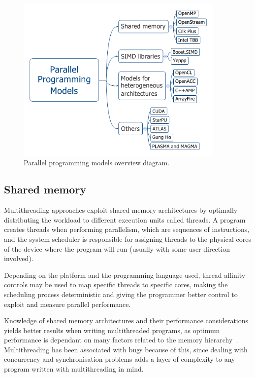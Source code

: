 \begin{figure}[!h]
\begin{center}
\centerline{\includegraphics[width=4in]{img/overview}}
\caption{Parallel programming models overview diagram.}
\label{f:overview}
\end{center}
\end{figure}

\subsection{Shared memory}

Multithreading approaches exploit \gls{shared memory} architectures by optimally distributing the workload to different execution units called \glspl{thread}. A program creates threads when performing parallelism, which are sequences of instructions, and the system scheduler is responsible for assigning threads to the physical cores of the device where the program will run (usually with some user direction involved).

Depending on the platform and the programming language used, thread affinity controls may be used to map specific threads to specific cores, making the scheduling process deterministic and giving the programmer better control to exploit and measure parallel performance.

Knowledge of shared memory architectures and their performance considerations yields better results when writing multithreaded programs, as optimum performance is dependant on many factors related to the memory hierarchy~\cite{dagum1998openmp}. Multithreading has been associated with bugs because of this, since dealing with concurrency and synchronisation problems adds a layer of complexity to any program written with multithreading in mind.

